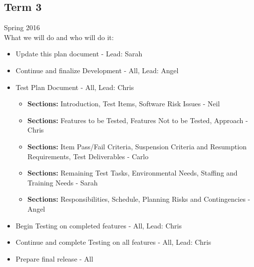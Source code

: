 \subsection{Term 3}
Spring 2016 \\
What we will do and who will do it:
\begin{itemize}
    \item Update this plan document - Lead: Sarah
	\item Continue and finalize Development - All, Lead: Angel
    \item Test Plan Document - All, Lead: Chris
        \begin{itemize}
            \item \textbf{Sections:} Introduction, Test Items, Software Risk Issues - Neil
            \item \textbf{Sections:} Features to be Tested, Features Not to be Tested, Approach - Chris
            \item \textbf{Sections:} Item Pass/Fail Criteria, Suspension Criteria and Resumption Requirements, Test Deliverables - Carlo
            \item \textbf{Sections:} Remaining Test Tasks, Environmental Needs, Staffing and Training Needs - Sarah 
            \item \textbf{Sections:} Responsibilities, Schedule, Planning Risks and Contingencies - Angel
        \end{itemize}
	\item Begin Testing on completed features - All, Lead: Chris
	\item Continue and complete Testing on all features - All, Lead: Chris
	\item Prepare final release - All
\end{itemize}

